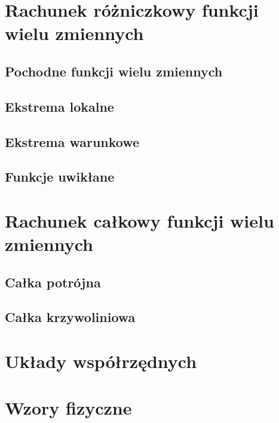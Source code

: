 \documentclass[11pt]{scrartcl}
\begin{document}
    \section{Rachunek różniczkowy funkcji wielu zmiennych}
    
        \subsection{Pochodne funkcji wielu zmiennych}
        
        \subsection{Ekstrema lokalne}
        
        \subsection{Ekstrema warunkowe}
        
        \subsection{Funkcje uwikłane}
        

    \section{Rachunek całkowy funkcji wielu zmiennych}
    
        \subsection{Całka potrójna}
        
        \subsection{Całka krzywoliniowa}
        


    \appendix

    \section{Układy współrzędnych} \label{s:coordinate systems}
    

    \section{Wzory fizyczne} \label{s:physics formulas}
    
\end{document}
